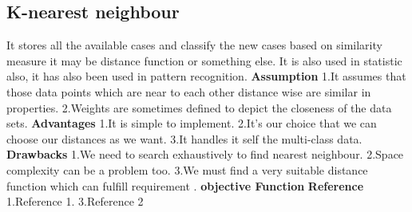 \documentclass{article}
\begin{document}
\subsection{K-nearest neighbour}
It stores all the available cases and classify the new cases based on similarity measure it may be distance function or something else. It is also used in statistic also, it has also been used in pattern recognition. \newline
\textbf{Assumption}\newline
1.It assumes that those data points which are near to each other distance wise are similar in properties.\newline
2.Weights are sometimes defined to depict the closeness of the data sets.\newline
\textbf{Advantages}\newline
1.It is simple to implement.\newline
2.It's our choice that we can choose our distances as we want.\newline
3.It handles it self the multi-class data.\newline
\textbf{Drawbacks}\newline
1.We need to search exhaustively to find nearest neighbour.\newline
2.Space complexity can be a problem too.\newline
3.We must find a very suitable distance function which can fulfill requirement . \newline
\textbf{objective Function}\newline
\textbf{Reference}\newline
1.Reference 1.\newline
3.Reference 2 \newline
\end{document}
